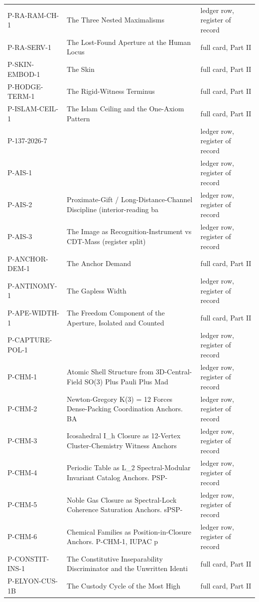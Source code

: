 \documentclass[10pt,twocolumn]{article}
\begin{document}
\begin{center}
\begin{longtable}{>{\raggedright\arraybackslash}p{}>{\raggedright\arraybackslash}p{}>{\raggedright\arraybackslash}p{}}
P-RA-RAM-CH-1 & The Three Nested Maximalisms & ledger row, register of record \\
P-RA-SERV-1 & The Lost-Found Aperture at the Human Locus & full card, Part II \\
P-SKIN-EMBOD-1 & The Skin & full card, Part II \\
P-HODGE-TERM-1 & [Ψ] The Rigid-Witness Terminus & full card, Part II \\
P-ISLAM-CEIL-1 & The Islam Ceiling and the One-Axiom Pattern & full card, Part II \\
P-137-2026-7 &  & ledger row, register of record \\
P-AIS-1 &  & ledger row, register of record \\
P-AIS-2 & Proximate-Gift / Long-Distance-Channel Discipline (interior-reading ba & ledger row, register of record \\
P-AIS-3 & The Image as Recognition-Instrument vs CDT-Mass (register split) & ledger row, register of record \\
P-ANCHOR-DEM-1 & The Anchor Demand & full card, Part II \\
P-ANTINOMY-1 & The Gapless Width & ledger row, register of record \\
P-APE-WIDTH-1 & The Freedom Component of the Aperture, Isolated and Counted & full card, Part II \\
P-CAPTURE-POL-1 &  & ledger row, register of record \\
P-CHM-1 & Atomic Shell Structure from 3D-Central-Field SO(3) Plus Pauli Plus Mad & ledger row, register of record \\
P-CHM-2 & Newton-Gregory K(3) = 12 Forces Dense-Packing Coordination Anchors. BA & ledger row, register of record \\
P-CHM-3 & Icosahedral I\_h Closure as 12-Vertex Cluster-Chemistry Witness Anchors & ledger row, register of record \\
P-CHM-4 & Periodic Table as L\_2 Spectral-Modular Invariant Catalog Anchors. PSP- & ledger row, register of record \\
P-CHM-5 & Noble Gas Closure as Spectral-Lock Coherence Saturation Anchors. sPSP- & ledger row, register of record \\
P-CHM-6 & Chemical Families as Position-in-Closure Anchors. P-CHM-1, IUPAC p & ledger row, register of record \\
P-CONSTIT-INS-1 & The Constitutive Inseparability Discriminator and the Unwritten Identi & full card, Part II \\
P-ELYON-CUS-1B & The Custody Cycle of the Most High & full card, Part II \\

\end{longtable}
\end{center}
\end{document}
